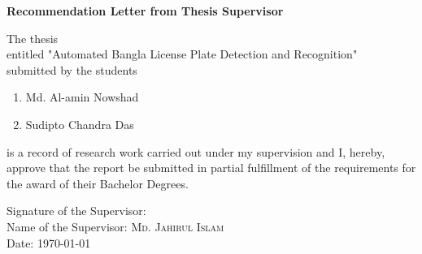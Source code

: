 \begin{center}
	\textbf{\huge Recommendation Letter from Thesis Supervisor}
\end{center}

\vspace{0.5cm}

\noindent
The thesis\\
entitled "{Automated Bangla License Plate Detection and Recognition}"\\
submitted by the students
\begin{enumerate}
	\item Md. Al-amin Nowshad
	\item Sudipto Chandra Das
\end{enumerate}
is a record of research work carried out under my supervision and I, hereby, approve that the report be submitted in partial fulfillment of the requirements for the award of their Bachelor Degrees.\\

\vspace{4.0cm}

\noindent
Signature of the Supervisor: \\
Name of the Supervisor: \textsc{\large Md. Jahirul Islam}\\%
Date: \today